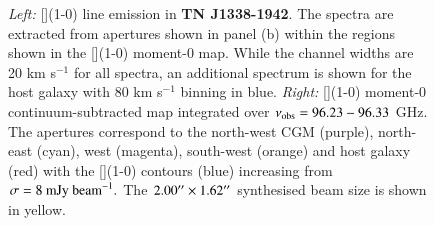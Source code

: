 \begin{figure}
\vspace*{-20pt}
\hspace*{-50pt}
\centering
{}
  \caption[{TN J1338-1942: [](1-0) line spectra and moment-0 maps}]{{\it Left:} [](1-0) line emission in {\bf TN J1338-1942}. The spectra are extracted from apertures shown in panel (b) within the regions shown in the [](1-0) moment-0 map. While the channel widths are 20 km s$^{-1}$ for all spectra, an additional spectrum is shown for the host galaxy with 80 km s$^{-1}$ binning in blue. {\it Right:} [](1-0) moment-0 continuum-subtracted map integrated over $\nu_{\rm obs}=96.23-96.33$ GHz. The apertures correspond to the north-west CGM (purple), north-east (cyan), west (magenta), south-west (orange) and host galaxy (red) with the [](1-0) contours (blue) increasing from $\sigma=8~\rm{mJy~beam}^{-1}.$ The $2.00^{\prime\prime} \times 1.62^{\prime\prime}$ synthesised beam size is shown in yellow.}
  \label{fig:TNJ1338-fit-CI-moment0}
\end{figure}

